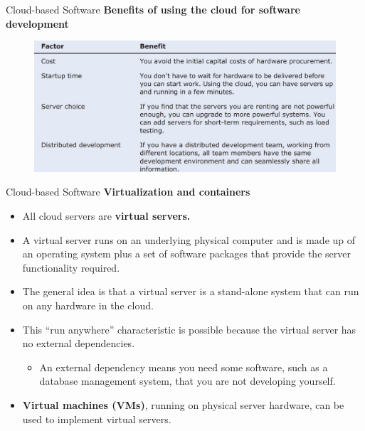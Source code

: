 \documentclass{beamer}
\begin{document}
\begin{frame}{Cloud-based Software}
		\textbf{Benefits of using the cloud for software development}
	
		\begin{figure}
			\includegraphics[scale=.4]{img/m5_5}
		\end{figure}

\end{frame}
\begin{frame}{Cloud-based Software}
	\textbf{Virtualization and containers}
\begin{itemize}
	\item All cloud servers are\textbf{ virtual servers. }
	\item A virtual server runs on an underlying physical computer and is made up of an operating system plus a set of software packages that provide the server functionality required.
	\item The general idea is that a virtual server is a stand-alone system that can run on any hardware in the cloud.
	\item This “run anywhere” characteristic is possible because the virtual server has no external dependencies. 
\begin{itemize}
		\item An external dependency means you need some software, such as a database management system, that you are not developing yourself.
\end{itemize}
	\item \textbf{Virtual machines (VMs)}, running on physical server hardware, can be used to implement virtual servers.

\end{itemize}	
\end{frame}
\end{document}
